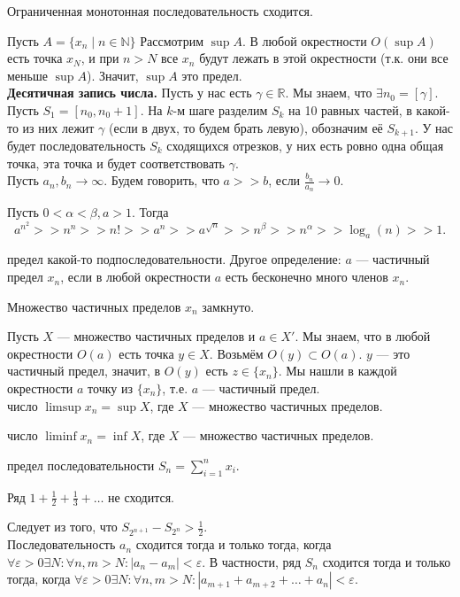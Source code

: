 \documentclass[12pt,a4paper]{article}
\begin{document}
\newpage
{} Ограниченная монотонная последовательность сходится.

\proof Пусть $A=\{x_n\mid n\in \mathbb N\}$ Рассмотрим $\sup A$. В любой окрестности $O(\sup A)$ есть точка $x_N$, и при $n>N$ все $x_n$ будут лежать в этой окрестности (т.к. они все меньше $\sup A$). Значит, $\sup A$ это предел.\QEDA\\

\textbf{Десятичная запись числа.} Пусть у нас есть $\gamma\in \mathbb R$. Мы знаем, что $\exists n_0=[\gamma]$. Пусть $S_1=[n_0,n_0+1]$. На $k$-м шаге разделим $S_k$ на 10 равных частей, в какой-то из них лежит $\gamma$ (если в двух, то будем брать левую), обозначим её $S_{k+1}$. У нас будет последовательность $S_k$ сходящихся отрезков, у них есть ровно одна общая точка, эта точка и будет соответствовать $\gamma$.\\

Пусть $a_n,b_n\to \infty$. Будем говорить, что $a>>b$, если $\frac{b_n}{a_n}\to 0$.

\lemma Пусть $0<\alpha<\beta,a>1$. Тогда \[
	a^{n^2}>>n^n>>n!>>a^n>>a^{\sqrt n}>>n^\beta>>n^\alpha>>\log_a(n)>>1.
\]

 предел какой-то подпоследовательности. Другое определение: $a$ --- частичный предел $x_n$, если в любой окрестности $a$ есть бесконечно много членов $x_n$.

\theorem Множество частичных пределов $x_n$ замкнуто.

\proof Пусть $X$ --- множество частичных пределов и $a\in X'$. Мы знаем, что в любой окрестности $O(a)$ есть точка $y\in X$. Возьмём $O(y)\subset O(a)$. $y$ --- это частичный предел, значит, в $O(y)$ есть $z\in\{x_n\}$. Мы нашли в каждой окрестности $a$ точку из $\{x_n\}$, т.е. $a$ --- частичный предел. \QEDA\\

 число $\limsup x_n=\sup X$, где $X$ --- множество частичных пределов.

 число $\liminf x_n=\inf X$, где $X$ --- множество частичных пределов.

 предел последовательности $S_n=\sum_{i=1}^n x_i$.

\lemma Ряд $1+\frac{1}{2}+\frac{1}{3}+\ldots $ не сходится.

\proof Следует из того, что $S_{2^{n+1}}-S_{2^n}>\frac{1}{2}$. \QEDA\\

 Последовательность $a_n$ сходится тогда и только тогда, когда $\forall\varepsilon>0\exists N:\forall n,m>N:|a_n-a_m|<\varepsilon$. В частности, ряд $S_n$ сходится тогда и только тогда, когда $\forall \varepsilon>0\exists N:\forall n,m>N:|a_{m+1}+a_{m+2}+\ldots +a_n|<\varepsilon$.\label{cauchy}
\end{document}
